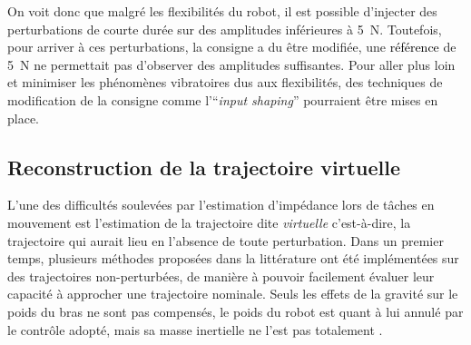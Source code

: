 On voit donc que malgré les flexibilités du robot, il est possible d'injecter des perturbations de courte durée sur des amplitudes inférieures à \SI{5}{\newton}. Toutefois, pour arriver à ces perturbations, la consigne a du être modifiée, une \textcolor{black}{référence} de \SI{5}{\newton} ne permettait pas d'observer des amplitudes suffisantes. Pour aller plus loin et minimiser les phénomènes vibratoires dus aux flexibilités, des techniques de modification de la consigne comme l'\foreignquote{french}{\textit{input shaping}} \parencite{singh_tutorial_2002} pourraient être mises en place.


\subsection{Reconstruction de la trajectoire virtuelle} \label{chap3_sec_method_sub_virt_traj}

L'une des difficultés soulevées par l'estimation d'impédance lors de tâches en mouvement est l'estimation de la trajectoire dite \emph{virtuelle} \parencite{tsuji_human_1997} c'est-à-dire, la trajectoire qui aurait lieu en l'absence de toute perturbation. Dans un premier temps, plusieurs méthodes proposées dans la littérature ont été implémentées sur des trajectoires non-perturbées, de manière à pouvoir facilement évaluer leur capacité à approcher une trajectoire nominale. Seuls les effets de la gravité sur le poids du bras ne sont pas compensés, le poids du robot est quant à lui annulé par le contrôle adopté, mais sa masse inertielle ne l'est pas totalement \parencite[Chapitre~3]{lamy_conception_2011}. 

